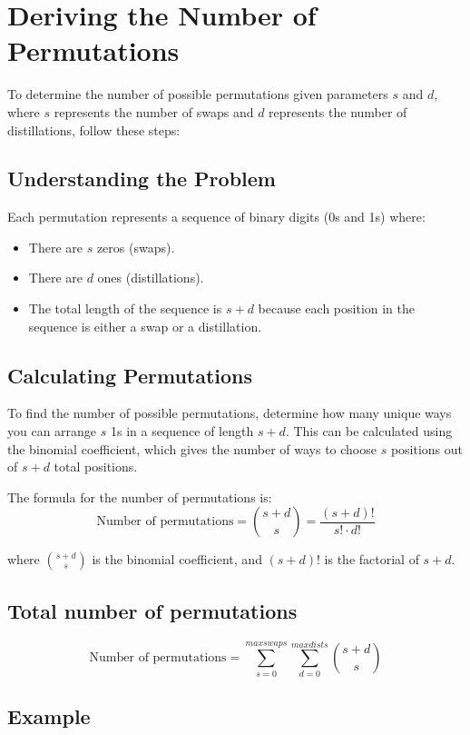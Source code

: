 \documentclass{article}
\begin{document}
\section*{Deriving the Number of Permutations}

To determine the number of possible permutations given parameters \(s\) and \(d\), where \(s\) represents the number of swaps and \(d\) represents the number of distillations, follow these steps:

\subsection*{Understanding the Problem}

Each permutation represents a sequence of binary digits (0s and 1s) where:
\begin{itemize}
    \item There are \(s\) zeros (swaps).
    \item There are \(d\) ones (distillations).
    \item The total length of the sequence is \(s + d\) because each position in the sequence is either a swap or a distillation.
\end{itemize}

\subsection*{Calculating Permutations}

To find the number of possible permutations, determine how many unique ways you can arrange \(s\) 1s in a sequence of length \(s + d\). This can be calculated using the binomial coefficient, which gives the number of ways to choose \(s\) positions out of \(s + d\) total positions.

The formula for the number of permutations is:
\[
\text{Number of permutations} = \binom{s+d}{s} = \frac{(s+d)!}{s! \cdot d!}
\]

where \(\binom{s+d}{s}\) is the binomial coefficient, and \((s+d)!\) is the factorial of \(s + d\).

\subsection*{Total number of permutations}

\[
\text{Number of permutations} = \sum_{s=0}^{max swaps} \sum_{d=0}^{max dists} \binom{s+d}{s}
\]


\subsection*{Example}
\end{document}
